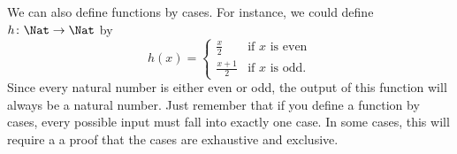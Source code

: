 \documentclass[../../../include/open-logic-section]{subfiles}
\begin{document}
\begin{ex}
We can also define functions by cases. For instance, we could define
$h \colon \Nat \to \Nat$  by
\[
h(x) =
\begin{cases}
  \frac{x}{2} & \text{if $x$ is even} \\
  \frac{x+1}{2} & \text{if $x$ is odd.}
\end{cases}
\]
Since every natural number is either even or odd, the output of this
function will always be a natural number. Just remember that if you
define a function by cases, every possible input must fall into
exactly one case.  In some cases, this will require a a proof that the
cases are exhaustive and exclusive.
\end{ex}
\end{document}
